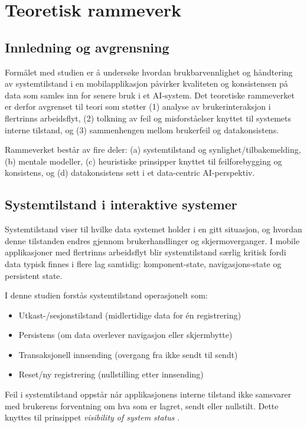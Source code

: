 \chapter{Teoretisk rammeverk}
\label{chap:theory}

\section{Innledning og avgrensning}

Formålet med studien er å undersøke hvordan brukbarvennlighet og håndtering av systemtilstand i en mobilapplikasjon påvirker kvaliteten og konsistensen på data som samles inn for senere bruk i et AI-system. Det teoretiske rammeverket er derfor avgrenset til teori som støtter (1) analyse av brukerinteraksjon i flertrinns arbeidsflyt, (2) tolkning av feil og misforståelser knyttet til systemets interne tilstand, og (3) sammenhengen mellom brukerfeil og datakonsistens.

Rammeverket består av fire deler: (a) systemtilstand og synlighet/tilbakemelding, (b) mentale modeller, (c) heuristiske prinsipper knyttet til feilforebygging og konsistens, og (d) datakonsistens sett i et data-centric AI-perspektiv.

\section{Systemtilstand i interaktive systemer}

Systemtilstand viser til hvilke data systemet holder i en gitt situasjon, og hvordan denne tilstanden endres gjennom brukerhandlinger og skjermoverganger. I mobile applikasjoner med flertrinns arbeidsflyt blir systemtilstand særlig kritisk fordi data typisk finnes i flere lag samtidig: komponent-state, navigasjons-state og persistent state.

I denne studien forstås systemtilstand operasjonelt som:

\begin{itemize}
\item Utkast-/sesjonstilstand (midlertidige data for én registrering)
\item Persistens (om data overlever navigasjon eller skjermbytte)
\item Transaksjonell innsending (overgang fra ikke sendt til sendt)
\item Reset/ny registrering (nullstilling etter innsending)
\end{itemize}

Feil i systemtilstand oppstår når applikasjonens interne tilstand ikke samsvarer med brukerens forventning om hva som er lagret, sendt eller nullstilt. Dette knyttes til prinsippet \textit{visibility of system status} \cite{nielsen1994}.


